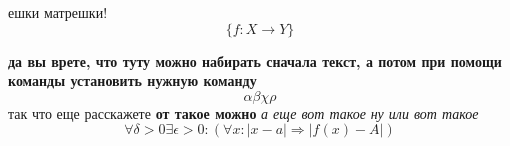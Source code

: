 \documentclass[10pt, a4paper,twocolumn]{article}
\begin{document}
ешки матрешки!
 $$\{f : X \to Y \}$$

\textbf{да вы врете, что туту можно набирать сначала текст, а потом при помощи команды установить нужную команду}
$$\alpha \beta \chi \rho $$
так что еще расскажете \textbf{от такое можно} \textsl{а еще вот такое} \textit{ну или вот такое}
$$\forall \delta > 0 \exists  \epsilon > 0 : (\forall x : |x - a| \Rightarrow |f(x) - A|)$$
\end{document}
